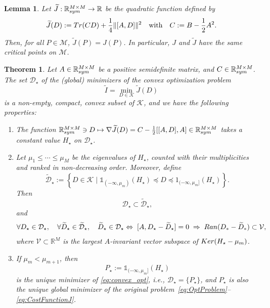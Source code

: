 \documentclass[10pt,a4paper]{amsart}
\newtheorem{lemma}{Lemma}
\newtheorem{theorem}{Theorem}
\def\R{\mathbb R}
\newcommand{\tr}{{\rm Tr}}
\begin{document}
\begin{lemma} \label{lem:convexification}
    Let $\widetilde J:\R^{M \times M}_{\rm sym} \to \R$ be the quadratic function defined by
\begin{equation}\label{eq:def_tildeJ}
\widetilde J(D) := \tr(CD) + \frac 14 \| [A,D] \|^2  \quad \mbox{with} \quad C := B- \frac 12 A^2.
\end{equation}
Then, for all $P \in \mathcal M$, $\widetilde J(P)=J(P)$. In particular, $J$ and $\widetilde J$ have the same critical points on $\mathcal M$.
\end{lemma}

\begin{theorem}
\label{thm:convex_pbm}
Let $A \in \R^{M \times M}_{\rm sym}$ be a positive semidefinite matrix, and $C \in \R^{M \times M}_{\rm sym}$.
The set $\mathcal D_\star$ of the (global) minimizers of the convex optimization problem
\begin{equation} \label{eq:convex_opt}
   \widetilde I= \min_{D \in \mathcal K} \widetilde J(D)
\end{equation}
is a non-empty, compact, convex subset of $\mathcal K$, and we have the following properties:
\begin{enumerate}
    \item The function $\R^{M\times M}_{\rm sym} \ni D \mapsto \nabla \widetilde J(D)=C- \frac 12[[A,D],A] \in \R^{M \times M}_{\rm sym}$ takes a constant value $H_\star$ on $\mathcal D_\star$.
    \item Let $\mu_1 \le \cdots \le \mu_M$ be the eigenvalues of $H_\star$, counted with their multiplicities and ranked in non-decreasing order. Moreover, define 
    \begin{equation*}
        \widetilde {\mathcal D}_\star:= \left\{ D \in \mathcal K \; | \;  \mathds 1_{(-\infty,\mu_m)}(H_\star) \preceq D \preceq 1_{(-\infty,\mu_m]}(H_\star) \right\}.
    \end{equation*}
    Then
    \begin{equation} \label{eq:DsubsetDtilde}
        {\mathcal D}_\star \subset \widetilde {\mathcal D}_\star,
    \end{equation}
    and 
    \begin{align}
    \forall D_\star \in \mathcal D_\star, \quad \forall \widetilde D_\star \in \widetilde{\mathcal D}_\star, \quad \widetilde D_\star \in \mathcal D_\star \Leftrightarrow \;  [A,D_\star-\widetilde D_\star]=0 \;   \Rightarrow  \;  {\rm Ran}(D_*-\widetilde D_*) \subset \mathcal V, \label{eq:charac_D_star}
    \end{align}
    where $\mathcal V \subset \R^M$ is the largest $A$-invariant vector subspace of ${\rm Ker}(H_\star-\mu_m)$.
\item If $\mu_m < \mu_{m+1}$, then 
\begin{equation}
    P_\star:= \mathds 1_{(-\infty,\mu_m]}(H_\star)
\end{equation}
is the unique minimizer of \eqref{eq:convex_opt}, i.e., $\mathcal D_\star=\{P_\star\}$, and $P_\star$ is also the unique global minimizer of the original problem~\eqref{eq:OptProblem}--\eqref{eq:CostFunctionJ}.
\end{enumerate}
\end{theorem}
\end{document}
